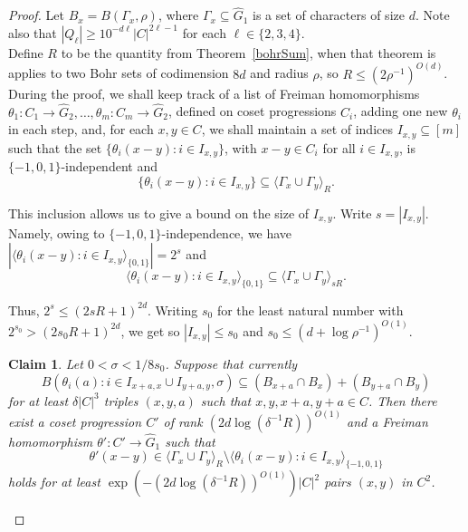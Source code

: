 \documentclass[a4paper,11pt]{article}
\numberwithin{theorem}{section}
\newtheorem{claim}[theorem]{Claim}
\theoremstyle{definition}
\begin{document}
\begin{proof}
    Let $B_x = B(\Gamma_x, \rho)$, where $\Gamma_x \subseteq \hat{G}_1$ is a set of characters of size $d$. Note also that $|Q_\ell| \geq 10^{-d \ell}|C|^{2\ell - 1}$ for each $\ell \in \{2,3,4\}$.\\

    Define $R$ to be the quantity from Theorem~\ref{bohrSum}, when that theorem is applies to two Bohr sets of codimension $8d$ and radius $\rho$, so $R \leq (2\rho^{-1})^{O(d)}$. During the proof, we shall keep track of a list of Freiman homomorphisms $\theta_1 : C_1 \to \hat{G}_2, \dots, \theta_m : C_m \to \hat{G}_2$, defined on coset progressions $C_i$, adding one new $\theta_i$ in each step, and, for each $x,y \in C$, we shall maintain a set of indices $I_{x,y} \subseteq [m]$ such that the set $\{ \theta_i(x - y) : i \in I_{x,y}\}$, with $x - y \in C_i$ for all $i \in I_{x,y}$, is $\{-1,0,1\}$-independent and
    \[\{ \theta_i(x - y) : i \in I_{x,y} \} \subseteq \langle \Gamma_x \cup \Gamma_y \rangle_R.\]
    
    This inclusion allows us to give a bound on the size of $I_{x,y}$. Write $s = |I_{x,y}|$. Namely, owing to $\{-1,0,1\}$-independence, we have $|\langle \theta_i(x - y) : i \in I_{x,y}\rangle_{\{0,1\}}| = 2^s$ and 
    \[\langle \theta_i(x - y) : i \in I_{x,y}\rangle_{\{0,1\}} \subseteq \langle \Gamma_x \cup \Gamma_y \rangle_{sR}.\]

    Thus, $2^s \leq (2sR + 1)^{2d}$. Writing $s_0$ for the least natural number with $2^{s_0} > (2s_0R + 1)^{2d}$, we get so $|I_{x,y}| \leq s_0$ and $s_0\leq (d + \log \rho^{-1})^{O(1)}$.
    
    \begin{claim}\label{claim1bilbogarg}
        Let $0 < \sigma < 1/8s_0$. Suppose that currently 
        \begin{equation}
        B(\theta_i(a) : i \in I_{x + a, x} \cup I_{y + a, y}, \sigma) \subseteq (B_{x + a} \cap B_x) + (B_{y + a} \cap B_y)
            \label{firstbogclaimeqn}
        \end{equation}
        \textbf{} for at least $\delta|C|^3$ triples $(x, y, a)$ such that $x,y, x+a, y+a \in C$. Then there exist a coset progression $C'$ of rank $(2d\log (\delta^{-1} R))^{O(1)}$ and a Freiman homomorphism $\theta' : C' \to \hat{G}_1$ such that 
        \[\theta'(x - y) \in \langle \Gamma_x \cup \Gamma_y \rangle_R \setminus \langle \theta_i(x - y) : i \in I_{x,y} \rangle_{\{-1,0,1\}}\]
        holds for at least $\exp(-(2d\log (\delta^{-1} R))^{O(1)})|C|^2$ pairs $(x,y)$ in $C^2$.
    \end{claim}


\end{proof}
\end{document}
